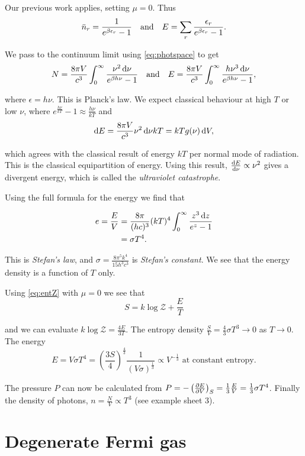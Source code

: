 \documentclass{notes}
\newcommand{\cZ}{\mathcal{Z}}
\newcommand{\pdf}[3]{\left(\pd{#1}{#2}\right)_{#3}}
\begin{document}
Our previous work applies, setting $\mu = 0$.  Thus
\[
\Bar{n}_r = \frac{1}{e^{\beta \epsilon_r} - 1} \quad \text{and} \quad
E = \sum_r \frac{\epsilon_r}{e^{\beta \epsilon_r} - 1}.
\]

We pass to the continuum limit using \eqref{eq:photspace} to get
\[
N = \frac{8 \pi V}{c^3} \int_0^\infty \frac{\nu^2\, \mathrm{d} \nu}{
e^{\beta h \nu} - 1} \quad \text{and} \quad
E = \frac{8 \pi V}{c^3} \int_0^\infty \frac{h \nu^3\, \mathrm{d} \nu}{
e^{\beta h \nu} - 1},
\]

where $\epsilon = h \nu$.  This is Planck's law.  We expect classical
behaviour at high $T$ or low $\nu$, where
$e^{\frac{h \nu}{k T}} - 1 \approx \tfrac{h \nu}{k T}$ and
\[
\mathrm{d} E = \frac{8 \pi V}{c^3} \nu^2\, \mathrm{d} \nu kT = k T g(\nu)\, \mathrm{d} V,
\]

which agrees with the classical result of energy $k T$ per normal mode
of radiation.  This is the classical equipartition of energy.  Using
this result, $\frac{\mathrm{d} E}{\mathrm{d}\nu} \propto \nu^2$ gives a divergent energy,
which is called the \emph{ultraviolet catastrophe}.

Using the full formula for the energy we find that

\begin{align*}
e = \frac{E}{V} &= \frac{8 \pi}{(h c)^3} (k T)^4 \int_0^\infty
\frac{z^3\, \mathrm{d} z}{e^z - 1}\\
&= \sigma T^4.
\end{align*}

This is \emph{Stefan's law}, and $\sigma = \frac{8 \pi^5 k^4}{15 h^3 c^3}$
is \emph{Stefan's constant}.  We see that the energy density is a function
of $T$ only.

Using \eqref{eq:entZ} with $\mu = 0$ we see that
\[
S = k \log \cZ + \frac{E}{T}
\]

and we can evaluate $k \log \cZ = \frac{4 E}{3 T}$.  The entropy
density $\tfrac{S}{V} = \tfrac{4}{3} \sigma T^3 \to 0$ as $T \to 0$.
The energy
\[
E = V \sigma T^4 = \left( \frac{3 S}{4} \right)^{\frac{4}{3}}
\frac{1}{(V \sigma)^{\frac{1}{3}}} \propto V^{-\frac{1}{3}} \text{ at
constant entropy.}
\]

The pressure $P$ can now be calculated from
$P = - \pdf{E}{V}{S} = \tfrac{1}{3} \tfrac{E}{V} = \tfrac{1}{3} \sigma T^4$.
Finally the density of photons, $n = \tfrac{N}{V} \propto T^3$ (see
example sheet 3).

\section{Degenerate Fermi gas}
\end{document}
